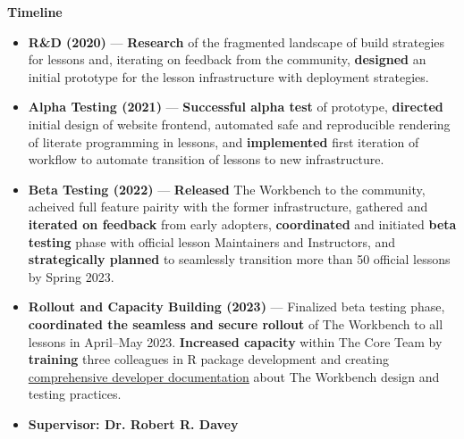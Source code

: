 {\begin{itemize}
  \end{itemize}
  \textbf{Timeline}
  \begin{itemize}
    \item \textbf{R\&D (2020)} --- \textbf{Research} of the fragmented landscape of
      build strategies for lessons and, iterating on feedback from the
      community, \textbf{designed} an initial prototype for the lesson
      infrastructure with deployment strategies.
    \item \textbf{Alpha Testing (2021)} --- \textbf{Successful alpha test} of prototype,
      \textbf{directed} initial design of website frontend, automated safe and
      reproducible rendering of literate programming in lessons, and
      \textbf{implemented} first iteration of workflow to automate transition
      of lessons to new infrastructure.
    \item \textbf{Beta Testing (2022)} --- \textbf{Released} The Workbench to the community,
      acheived full feature pairity with the former infrastructure, gathered
      and \textbf{iterated on feedback} from early adopters,
      \textbf{coordinated} and initiated \textbf{beta testing} phase with official
      lesson Maintainers and Instructors, and \textbf{strategically planned} to
      seamlessly transition more than 50 official lessons by Spring 2023.
    \item \textbf{Rollout and Capacity Building (2023)} --- Finalized beta testing phase, \textbf{coordinated
      the seamless and secure rollout} of The Workbench to all lessons in
      April--May 2023. \textbf{Increased capacity} within The Core Team by
      \textbf{training} three colleagues in R package development and creating
      \href{https://carpentries.github.io/workbench-dev}{comprehensive
      developer documentation} about The Workbench design and testing
      practices.
    \item \textbf{Supervisor: Dr. Robert R. Davey}
  \end{itemize}
}
